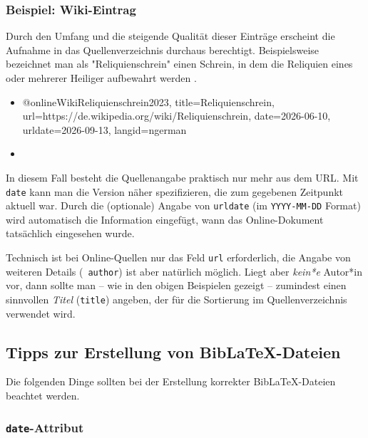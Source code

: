 \subsubsection{Beispiel: Wiki-Eintrag}
\label{sec:@online-www}

Durch den Umfang und die steigende Qualität dieser Einträge erscheint die
Aufnahme in das Quellenverzeichnis durchaus berechtigt. Beispielsweise
bezeichnet man als "Reliquienschrein" einen Schrein, in dem die Reliquien
eines oder mehrerer Heiliger aufbewahrt werden \cite{WikiReliquienschrein2023}.
%
\begin{itemize}
\item[]
\begin{GenericCode}[numbers=none]
@online{WikiReliquienschrein2023,
  title={Reliquienschrein},
  url={https://de.wikipedia.org/wiki/Reliquienschrein},
  date={2026-06-10},
  urldate={2026-09-13},
  langid={ngerman}
}
\end{GenericCode}
\item[\cite{WikiReliquienschrein2023}] 
\end{itemize}
%
In diesem Fall besteht die Quellenangabe praktisch nur mehr aus dem URL. Mit
\texttt{date} kann man die Version näher spezifizieren, die zum gegebenen
Zeitpunkt aktuell war. Durch die (optionale) Angabe von \texttt{urldate} (im
\texttt{YYYY-MM-DD} Format) wird automatisch die Information eingefügt, wann
das Online-Dokument tatsächlich eingesehen wurde.

Technisch ist bei Online-Quellen nur das Feld \texttt{url}
erforderlich, die Angabe von weiteren Details (\zB\ \texttt{author}) ist aber
natürlich möglich. Liegt aber \emph{kein*e} Autor*in vor, dann sollte man --
wie in den obigen Beispielen gezeigt -- zumindest einen sinnvollen
\emph{Titel} (\texttt{title}) angeben, der für die Sortierung im
Quellenverzeichnis verwendet wird.


\subsection{Tipps zur Erstellung von BibLaTeX-Dateien}
\label{sec:TippsZuBiblatex}

Die folgenden Dinge sollten bei der Erstellung korrekter BibLaTeX-Dateien
beachtet werden.

\subsubsection{\texttt{date}-Attribut}


